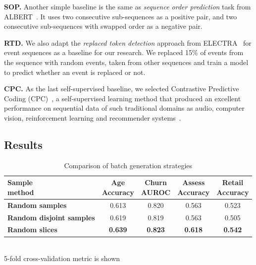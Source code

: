 \documentclass[sigconf, anonymous]{acmart}
\begin{document}
\textbf{SOP.} Another simple baseline is the same as \textit{sequence order prediction} task from ALBERT~\citep{Lan2020ALBERTAL}. It uses two consecutive sub-sequences as a positive pair, and two consecutive sub-sequences with swapped order as a negative pair.

\textbf{RTD.} We also adapt the \textit{replaced token detection} approach from ELECTRA~\citep{Clark2020ELECTRAPT} for event sequences as a baseline for our research. We replaced 15\% of events from the sequence with random events, taken from other sequences and train a model to predict whether an event is replaced or not.

\textbf{CPC.} As the last self-supervised baseline, we selected Contrastive Predictive Coding (CPC)~\citep{Oord2018RepresentationLW}, a self-supervised learning method that produced an excellent performance on sequential data of such traditional domains as audio, computer vision, reinforcement learning and recommender systems~\citep{Zhou2020ContrastiveLF}.

\subsection{Results} \label{sec-res}

\begin{table}
\centering
\caption{Comparison of batch generation strategies}
\begin{tabularx}{\linewidth}{Xcccc}
\toprule
\makecell{\textbf{Sample} \\ \textbf{method}} &
\makecell{\textbf{Age} \\ \small{Accuracy}} &
\makecell{\textbf{Churn} \\ \small{AUROC}} &
\makecell{\textbf{Assess} \\ \small{Accuracy}} &
\makecell{\textbf{Retail} \\ \small{Accuracy}} \\
\midrule
\textbf{Random samples} & 0.613 & 0.820 & 0.563 & 0.523 \\
\textbf{Random disjoint samples} & 0.619 & 0.819 & 0.563 & 0.505 \\
\textbf{Random slices} & \textbf{0.639} & \textbf{0.823} & \textbf{0.618} & \textbf{0.542} \\
\bottomrule
\end{tabularx} \\
\small{5-fold cross-validation metric is shown}
\label{tab-pair-gen}
\end{table}
\end{document}
